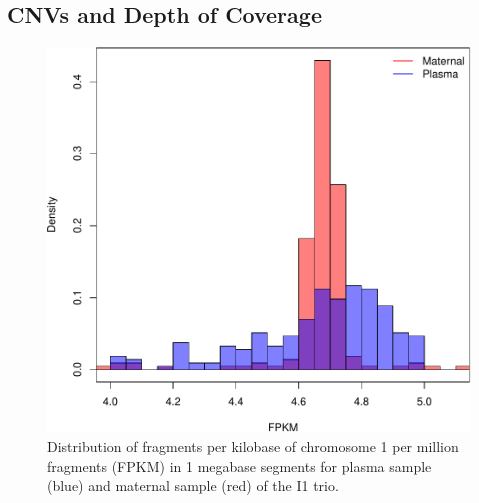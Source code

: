 \subsection{CNVs and Depth of Coverage}\label{ss:coverage}
\begin{figure}
\caption{Distribution of fragments per kilobase of chromosome 1 per million fragments (FPKM) in 1 megabase segments for plasma sample (blue) and maternal sample (red) of the I1 trio.}
\label{fig:fpkm}
\centering
\includegraphics[height=0.33\textheight]{figures/histo-crop}
\end{figure}

